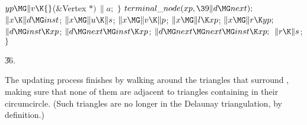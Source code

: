 ${}\\{yp}\MG\|v\K{}$(\&{Vertex} ${}{*})\,\|a;{}$\6
\4${}\}{}$\2\6
${}\\{terminal\_node}(\\{xp},\39\|d\MG\\{next});{}$\6
${}\|x\K\|d\MG\\{inst}{}$;\5
${}\|x\MG\|u\K\|s{}$;\5
${}\|x\MG\|v\K\|p{}$;\5
${}\|x\MG\|l\K\\{xp}{}$;\5
${}\|x\MG\|r\K\\{yp};{}$\6
${}\|d\MG\\{inst}\K\\{xp}{}$;\5
${}\|d\MG\\{next}\MG\\{inst}\K\\{xp}{}$;\5
${}\|d\MG\\{next}\MG\\{next}\MG\\{inst}\K\\{xp};{}$\6
${}\|r\K\|s{}$;\6
\4${}\}{}$\2\par
\U36.\fi

The updating process finishes by walking around the triangles
that surround , making sure that none of them are adjacent to
triangles containing  in their circumcircle. (Such triangles are
no longer in the Delaunay triangulation, by definition.)

